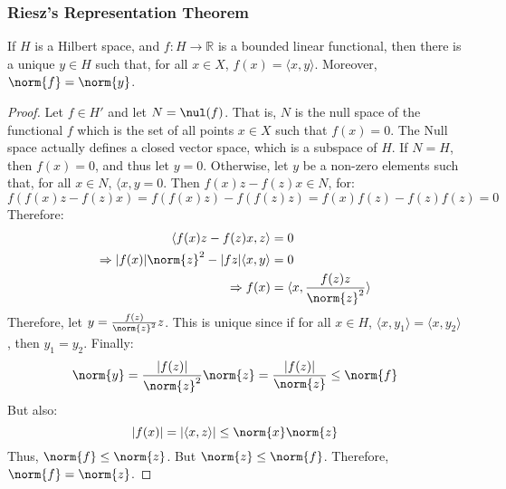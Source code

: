 \documentclass[crop=false,class=article,oneside]{standalone}
\begin{document}
        \subsubsection{Riesz's Representation Theorem}
            \begin{theorem}
                If $H$ is a Hilbert space, and
                $f:H\rightarrow\mathbb{R}$ is a bounded
                linear functional, then there is a unique
                $y\in{H}$ such that, for all $x\in{X}$,
                $f(x)=\langle{x,y}\rangle$. Moreover,
                $\norm{f}=\norm{y}$.
            \end{theorem}
            \begin{proof}
                Let $f\in{H'}$ and let $N=\nul(f)$. That is,
                $N$ is the null space of the functional $f$
                which is the set of all points
                $x\in{X}$ such that $f(x)=0$. The Null space
                actually defines a closed vector space, which
                is a subspace of $H$. If $N=H$, then
                $f(x)=0$, and thus let $y=0$. Otherwise, let $y$
                be a non-zero elements such that,
                for all $x\in{N}$, $\langle{x,y}=0$.
                Then $f(x)z-f(z)x\in{N}$, for:
                \begin{equation*}
                    f(f(x)z-f(z)x)
                    =f(f(x)z)-f(f(z)z)
                    =f(x)f(z)-f(z)f(z)=0
                \end{equation*}
                Therefore:
                \begin{align*}
                    \langle{f(x)z-f(z)x,z}\rangle&=0\\
                    \Rightarrow
                    |f(x)|\norm{z}^{2}-|fz|\langle{x,y}\rangle&=0\\
                    \Rightarrow
                    f(x)
                    &=\langle{x,\frac{f(z)z}{\norm{z}^{2}}}\rangle
                \end{align*}
                Therefore, let $y=\frac{f(z)}{\norm{z}^{2}}z$.
                This is unique since if for all $x\in{H}$,
                $\langle{x,y_{1}}\rangle=\langle{x,y_{2}}\rangle$,
                then $y_{1}=y_{2}$. Finally:
                \begin{equation*}
                    \norm{y}
                    =\frac{|f(z)|}{\norm{z}^{2}}\norm{z}
                    =\frac{|f(z)|}{\norm{z}}
                    \leq\norm{f}
                \end{equation*}
                But also:
                \begin{equation*}
                    |f(x)|=|\langle{x,z}\rangle|
                    \leq\norm{x}\norm{z}
                \end{equation*}
                Thus, $\norm{f}\leq\norm{z}$. But
                $\norm{z}\leq\norm{f}$. Therefore,
                $\norm{f}=\norm{z}$.
            \end{proof}
\end{document}
